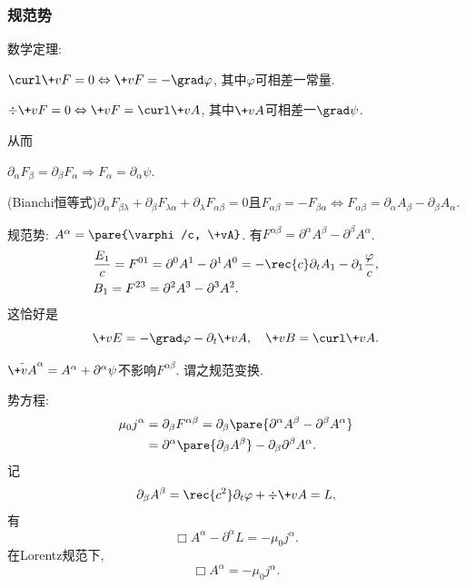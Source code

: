 \documentclass[hidelinks]{ctexart}
\begin{document}

\subsubsection{规范势} %
\label{ssub:规范势}

\begin{cenum}
    \item 数学定理:
    \begin{cenum}
        \item $\curl \+vF = 0 \Leftrightarrow \+vF = -\grad \varphi$, 其中$\varphi$可相差一常量.
        \item $\div \+vF = 0 \Leftrightarrow \+vF = \curl \+vA$, 其中$\+vA$可相差一$\grad \psi$.
    \end{cenum}
    从而
    \begin{cenum}
        \item $\partial_\alpha F_\beta = \partial_\beta F_\alpha \Rightarrow F_\alpha = \partial_\alpha \psi$.
        \item (Bianchi恒等式)$\partial_\alpha F_{\beta\lambda} + \partial_\beta F_{\lambda\alpha} + \partial_\lambda F_{\alpha\beta} = 0$且$F_{\alpha\beta} = -F_{\beta\alpha} \Leftrightarrow F_{\alpha\beta} = \partial_\alpha A_\beta - \partial_\beta A_\alpha$.
    \end{cenum}
    \item 规范势: $A^\alpha = \pare{\varphi/c, \+vA}$. 有$F^{\alpha\beta} = \partial^\alpha A^\beta - \partial^\beta A^\alpha$.
    \begin{align*}
        & \frac{E_1}{c} = F^{01} = \partial^0 A^1 - \partial^1 A^0 = -\rec{c}\partial_t A_1 - \partial_1 \frac{\varphi}{c}, \\
        & B_1 = F^{23} = \partial^2 A^3 - \partial^3 A^2.
    \end{align*}
    这恰好是
    \[ \+vE = -\grad \varphi - \partial_t \+vA,\quad \+vB = \curl \+vA. \]
    \item $\tilde{\+vA}^\alpha = A^\alpha + \partial^\alpha\psi$不影响$F^{\alpha\beta}$. 谓之规范变换.
    \item 势方程:
    \begin{align*}
        \mu_0 j^\alpha &= \partial_\beta F^{\alpha\beta} = \partial_\beta \pare{\partial^\alpha A^\beta - \partial^\beta A^\alpha} \\
        &= \partial^\alpha \pare{\partial_\beta A^\beta} - \partial_\beta \partial^\beta A^\alpha.
    \end{align*}
    记
    \[ \partial_\beta A^\beta = \rec{c^2}\partial_t \varphi + \div \+vA = L, \]
    有
    \[ \Box{} A^\alpha - \partial^\alpha L = -\mu_0 j^\alpha. \]
    在Lorentz规范下,
    \[ \Box{}A^\alpha = -\mu_0 j^\alpha. \]
\end{cenum}
\end{document}
